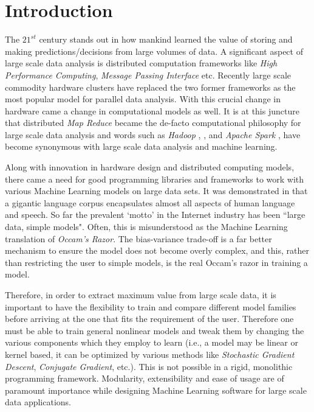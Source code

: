 \chapter{Introduction}
\label{cha:intro}
The $21^{st}$ century stands out in how mankind learned the value of storing and making predictions/decisions from large volumes of data. A significant aspect of large scale data analysis is distributed computation frameworks like \textit{High Performance Computing}, \textit{Message Passing Interface} etc. Recently large scale commodity hardware clusters have replaced the two former frameworks as the most popular model for parallel data analysis. With this crucial change in hardware came a change in computational models as well. It is at this juncture that distributed \textit{Map Reduce} became the de-facto computational philosophy for large scale data analysis and  words such as \textit{Hadoop} \cite{Hadoop:2005}, \cite{chang2008bigtable}, \cite{Borthakur2011} and \textit{Apache Spark} \cite{Zaharia2010}, \cite{Spark:2010} have become synonymous with large scale data analysis and machine learning.

Along with innovation in hardware design and distributed computing models, there came a need for good programming libraries and frameworks to work with various Machine Learning models on large data sets. It was demonstrated in \cite{10.1109/MIS.2009.36} that a gigantic language corpus encapsulates almost all aspects of human language and speech. So far the prevalent `motto' in the Internet industry has been ``large data, simple models". Often, this is misunderstood as the Machine Learning translation of \textit{Occam's Razor}. The bias-variance trade-off \cite{Valentini2004} is a far better mechanism to ensure the model does not become overly complex, and this, rather than restricting the user to simple models, is the real Occam's razor in training a model. 

Therefore, in order to extract maximum value from large scale data, it is important to have the flexibility to train and compare different model families before arriving at the one that fits the requirement of the user. Therefore one must be able to train general nonlinear models and tweak them by changing the various components which they employ to learn (i.e., a model may be linear or kernel based, it can be optimized by various methods like \textit{Stochastic Gradient Descent}, \textit{Conjugate Gradient}, etc.). This is not possible in a rigid, monolithic programming framework. Modularity, extensibility and ease of usage are of paramount importance while designing Machine Learning software for large scale data applications.

